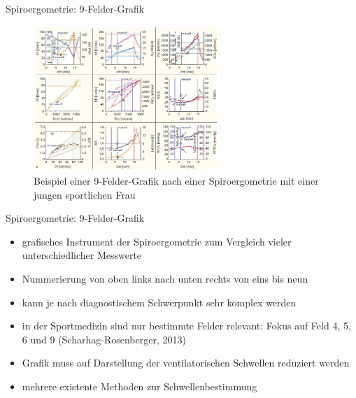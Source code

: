 \documentclass[colorBG,slideColor,9pt]{beamer}
\begin{document}
\begin{frame}{Spiroergometrie: 9-Felder-Grafik}
\begin{figure}[H]
\centering
\includegraphics[width=7cm]{Bilder/9fieldcomplex.png}
\caption{Beispiel einer 9-Felder-Grafik nach einer Spiroergometrie mit einer jungen sportlichen Frau}
\end{figure}
\end{frame}

\begin{frame}{Spiroergometrie: 9-Felder-Grafik}
\begin{itemize}
\item grafisches Instrument der Spiroergometrie zum Vergleich vieler unterschiedlicher Messwerte
\item Nummerierung von oben links nach unten rechts von eins bis neun
\item kann je nach diagnostischem Schwerpunkt sehr komplex werden
\item in der Sportmedizin sind nur bestimmte Felder relevant: Fokus auf Feld 4, 5, 6 und 9 (Scharhag-Rosenberger, 2013)
\item Grafik muss auf Darstellung der ventilatorischen Schwellen reduziert werden
\item mehrere existente Methoden zur Schwellenbestimmung
\end{itemize}
\end{frame}
\end{document}

